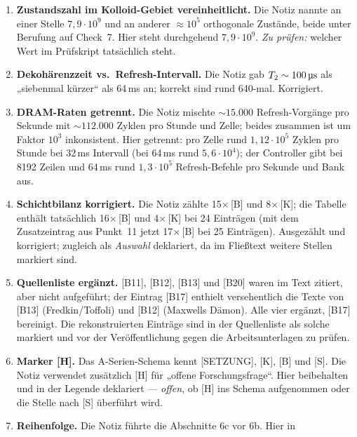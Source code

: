 \documentclass[11pt,a4paper]{article}
\begin{document}
\begin{enumerate}[leftmargin=1.6em,itemsep=0.4em]
  \item \textbf{Zustandszahl im Kolloid-Gebiet vereinheitlicht.} Die Notiz nannte
        an einer Stelle $7{,}9\cdot10^{9}$ und an anderer ${\approx}10^{5}$
        orthogonale Zustände, beide unter Berufung auf Check~7. Hier steht
        durchgehend $7{,}9\cdot10^{9}$. \emph{Zu prüfen:} welcher Wert im
        Prüfskript tatsächlich steht.
  \item \textbf{Dekohärenzzeit vs.\ Refresh-Intervall.} Die Notiz gab
        $T_2 \sim 100\,\text{\textmu s}$ als „siebenmal kürzer“ als 64\,ms an;
        korrekt sind rund 640-mal. Korrigiert.
  \item \textbf{DRAM-Raten getrennt.} Die Notiz mischte ${\sim}15{.}000$
        Refresh-Vorgänge pro Sekunde mit ${\sim}112{.}000$ Zyklen pro Stunde und
        Zelle; beides zusammen ist um Faktor $10^{3}$ inkonsistent. Hier
        getrennt: pro Zelle rund $1{,}12\cdot10^{5}$ Zyklen pro Stunde bei
        32\,ms Intervall (bei 64\,ms rund $5{,}6\cdot10^{4}$); der Controller
        gibt bei 8192 Zeilen und 64\,ms rund $1{,}3\cdot10^{5}$ Refresh-Befehle
        pro Sekunde und Bank aus.
  \item \textbf{Schichtbilanz korrigiert.} Die Notiz zählte
        15$\times$\,[B] und 8$\times$\,[K]; die Tabelle enthält tatsächlich
        16$\times$\,[B] und 4$\times$\,[K] bei 24 Einträgen (mit dem
        Zusatzeintrag aus Punkt~11 jetzt 17$\times$\,[B] bei 25 Einträgen). Ausgezählt und
        korrigiert; zugleich als \emph{Auswahl} deklariert, da im Fließtext
        weitere Stellen markiert sind.
  \item \textbf{Quellenliste ergänzt.} [B11], [B12], [B13] und [B20] waren im Text
        zitiert, aber nicht aufgeführt; der Eintrag [B17] enthielt versehentlich
        die Texte von [B13] (Fredkin/Toffoli) und [B12] (Maxwells Dämon). Alle
        vier ergänzt, [B17] bereinigt. Die rekonstruierten Einträge sind in der
        Quellenliste als solche markiert und vor der Veröffentlichung gegen die
        Arbeitsunterlagen zu prüfen.
  \item \textbf{Marker [H].} Das A-Serien-Schema kennt [SETZUNG], [K], [B] und
        [S]. Die Notiz verwendet zusätzlich [H] für „offene Forschungsfrage“.
        Hier beibehalten und in der Legende deklariert --- \emph{offen}, ob [H]
        ins Schema aufgenommen oder die Stelle nach [S] überführt wird.
  \item \textbf{Reihenfolge.} Die Notiz führte die Abschnitte 6c vor 6b. Hier in

\end{enumerate}
\end{document}
